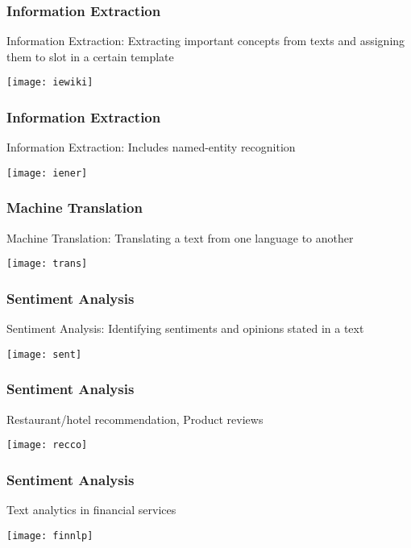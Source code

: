 \begin{frame}[fragile]\frametitle{Information Extraction}
Information Extraction: Extracting important concepts from texts and assigning them to slot in a certain template
\begin{center}
\texttt{[image: iewiki]}
\end{center}
\end{frame}

\begin{frame}[fragile]\frametitle{Information Extraction}
Information Extraction: Includes named-entity recognition
\begin{center}
\texttt{[image: iener]}
\end{center}
\end{frame}

\begin{frame}[fragile]\frametitle{Machine Translation}
Machine Translation: Translating a text from one language to another
\begin{center}
\texttt{[image: trans]}
\end{center}
\end{frame}


\begin{frame}[fragile]\frametitle{Sentiment Analysis}
Sentiment Analysis: Identifying sentiments and opinions stated in a text
\begin{center}
\texttt{[image: sent]}
\end{center}
\end{frame}


\begin{frame}[fragile]\frametitle{Sentiment Analysis}
Restaurant/hotel recommendation, Product reviews
\begin{center}
\texttt{[image: recco]}
\end{center}
\end{frame}

\begin{frame}[fragile]\frametitle{Sentiment Analysis}
Text analytics in financial services

\begin{center}
\texttt{[image: finnlp]}
\end{center}
\end{frame}


